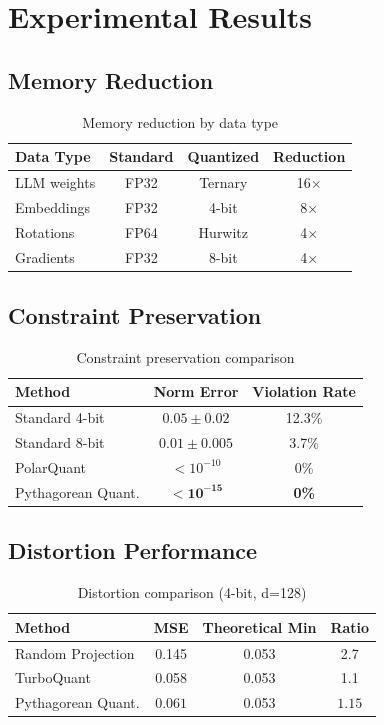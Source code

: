 \documentclass{article}
\begin{document}
\section{Experimental Results}

\subsection{Memory Reduction}

\begin{table}[h]
\centering
\begin{tabular}{lccc}
\toprule
\textbf{Data Type} & \textbf{Standard} & \textbf{Quantized} & \textbf{Reduction} \\
\midrule
LLM weights & FP32 & Ternary & 16$\times$ \\
Embeddings & FP32 & 4-bit & 8$\times$ \\
Rotations & FP64 & Hurwitz & 4$\times$ \\
Gradients & FP32 & 8-bit & 4$\times$ \\
\bottomrule
\end{tabular}
\caption{Memory reduction by data type}
\end{table}

\subsection{Constraint Preservation}

\begin{table}[h]
\centering
\begin{tabular}{lcc}
\toprule
\textbf{Method} & \textbf{Norm Error} & \textbf{Violation Rate} \\
\midrule
Standard 4-bit & $0.05 \pm 0.02$ & 12.3\% \\
Standard 8-bit & $0.01 \pm 0.005$ & 3.7\% \\
PolarQuant & $< 10^{-10}$ & 0\% \\
Pythagorean Quant. & $\mathbf{< 10^{-15}}$ & \textbf{0\%} \\
\bottomrule
\end{tabular}
\caption{Constraint preservation comparison}
\end{table}

\subsection{Distortion Performance}

\begin{table}[h]
\centering
\begin{tabular}{lccc}
\toprule
\textbf{Method} & \textbf{MSE} & \textbf{Theoretical Min} & \textbf{Ratio} \\
\midrule
Random Projection & 0.145 & 0.053 & 2.7 \\
TurboQuant & 0.058 & 0.053 & 1.1 \\
Pythagorean Quant. & $\mathbf{0.061}$ & 0.053 & $\mathbf{1.15}$ \\
\bottomrule
\end{tabular}
\caption{Distortion comparison (4-bit, d=128)}
\end{table}
\end{document}
